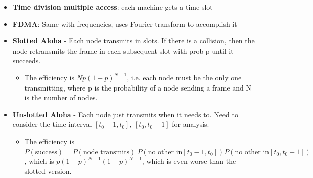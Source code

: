 \documentclass{article}
\begin{document}
\begin{itemize}
    \item \textbf{Time division multiple access}: each machine gets a time slot
    \item \textbf{FDMA}: Same with frequencies, uses Fourier transform to accomplish it
    \item \textbf{Slotted Aloha} - Each node transmits in slots. If there is a collision, then the node retransmits the frame in each subsequent slot with prob p until it succeeds.
    \begin{itemize}
        \item The efficiency is $Np(1-p)^{N-1}$, i.e. each node must be the only one transmitting, where p is the probability of a node sending a frame and N is the number of nodes.
    \end{itemize}
    \item \textbf{Unslotted Aloha} - Each node just transmits when it needs to. Need to consider the time interval $[t_0 - 1, t_0]$, $[t_0, t_0 + 1]$ for analysis.
    \begin{itemize}
        \item The efficiency is $P(\text{success}) = P(\text{node transmits})\ P(\text{no other in} [t_0 - 1, t_0]) P(\text{no other in} [t_0, t_0 + 1])$, which is $p (1 - p)^{N -1} ( 1 - p)^{N - 1}$, which is even worse than the slotted version.
    \end{itemize}
\end{itemize}
\end{document}
